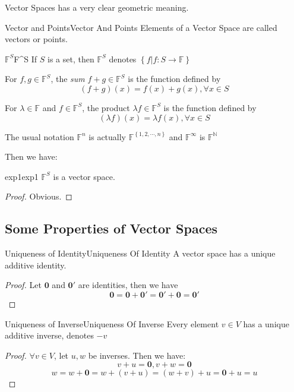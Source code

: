 \documentclass[../main.tex]{subfiles}
\begin{document}
Vector Spaces has a very clear geometric meaning.
\begin{definition}{Vector and Points}{Vector And Points}
Elements of a Vector Space are called vectors or points.
\end{definition}

\begin{notation}{$\mathbb{F}^{S}$}{F^S}
If $S$ is a set, then $\mathbb{F}^{S}$ denotes $\left\{ f | f: S \rightarrow \mathbb{F} \right\}$

For $f,g \in \mathbb{F}^{S}$, the \emph{sum} $f+g \in \mathbb{F}^{S}$ is the function defined by
\begin{equation}
	(f+g)(x) = f(x)+g(x), \forall x \in S
\end{equation}

For $\lambda \in \mathbb{F}$ and $f \in \mathbb{F}^{S}$, the product $\lambda f \in \mathbb{F}^{S}$ is the function defined by
\begin{equation}
	(\lambda f)(x) = \lambda f(x), \forall x \in S
\end{equation}

The usual notation $\mathbb{F}^{n}$ is actually $\mathbb{F}^{\left\{ 1,2, \cdots,n \right\}}$ and $\mathbb{F}^{\infty }$ is $\mathbb{F}^{\mathbb{N}}$
\end{notation}

Then we have:
\begin{example}{exp1}{exp1}
$\mathbb{F}^{S}$ is a vector space.
\end{example}
\begin{proof}
Obvious.
\end{proof}

\subsection{Some Properties of Vector Spaces}
\begin{theorem}{Uniqueness of Identity}{Uniqueness Of Identity}
A vector space has a unique additive identity.
\end{theorem}
\begin{proof}
Let $\boldsymbol{0}$ and $\boldsymbol{0'}$ are identities, then we have
\begin{equation*}
\boldsymbol{0}=\boldsymbol{0} + \boldsymbol{0'} = \boldsymbol{0'} + \boldsymbol{0} = \boldsymbol{0'}
\end{equation*}
\end{proof}

\begin{theorem}{Uniqueness of Inverse}{Uniqueness Of Inverse}
Every element $v \in V$ has a unique additive inverse, denotes $-v$
\end{theorem}
\begin{proof}
$\forall v \in V$, let $u,w$ be inverses. Then we have:
\begin{equation*}
v+u=\boldsymbol{0},v+w=\boldsymbol{0}
\end{equation*}
\begin{equation*}
w=w+\boldsymbol{0}=w+(v+u)=(w+v)+u=\boldsymbol{0}+u=u 
\end{equation*}
\end{proof}
\end{document}

